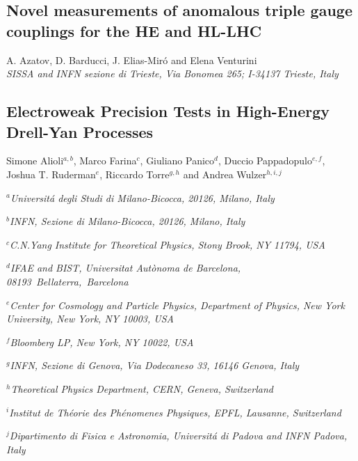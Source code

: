 \documentclass[../report.tex]{subfiles}
\providecommand{\main}{..}
\begin{document}




\subsection{Novel measurements of anomalous triple gauge couplings for the HE and HL-LHC} \label{sec:WZtrans}
\begin{center}
{A. Azatov, D. Barducci, J. Elias-Mir\'o and Elena Venturini}\\
 {\it \small
SISSA and INFN sezione di Trieste, Via Bonomea 265; I-34137 Trieste, Italy\\
 }
\end{center}



\subsection{Electroweak Precision Tests  in High-Energy Drell-Yan Processes} \label{DY}
\begin{center}
{Simone Alioli$^{a,b}$, Marco Farina$^{c}$,  Giuliano Panico$^{d}$,  Duccio Pappadopulo$^{e,f}$,\\
  Joshua T. Ruderman$^e$, Riccardo Torre$^{g,h}$  and Andrea Wulzer$^{h,i,j}$}
\centerline{$^a${\it Universit\'a degli Studi di Milano-Bicocca,
20126, Milano, Italy}}
\centerline{$^b${\it INFN, Sezione di Milano-Bicocca,
20126, Milano, Italy}}
\centerline{$^c${\it C.N.Yang Institute for Theoretical Physics, Stony Brook, NY 11794, USA}}
\centerline{$^d${\it \small IFAE and BIST, Universitat Aut\`onoma de Barcelona, 08193~Bellaterra,~Barcelona}}
\centerline{$^e${\it \small Center for Cosmology and Particle Physics, Department of Physics,
New York University, New York, NY 10003, USA}}
\centerline{$^f${\it\small Bloomberg LP, New York, NY 10022, USA}}
\centerline{$^g${\it \small INFN, Sezione di Genova, Via Dodecaneso 33, 16146 Genova, Italy}}
\centerline{$^h${\it\small Theoretical Physics Department, CERN, Geneva, Switzerland}}
\centerline{$^i${\it \small Institut de Th\'eorie des Ph\'enomenes Physiques, EPFL, Lausanne, Switzerland}}
\centerline{$^j${\it \small Dipartimento di Fisica e Astronomia, Universit\'a di Padova and INFN Padova, Italy}}
\end{center}

\end{document}
